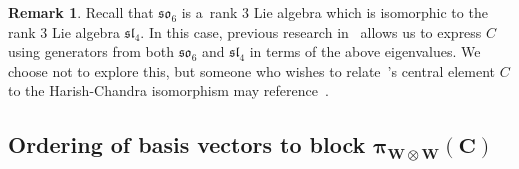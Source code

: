 \documentclass[pdftex]{sigma}
\numberwithin{equation}{section}
\theoremstyle{definition}
\newtheorem{Remark}[Theorem]{Remark}
\begin{document}
\begin{Remark}
 Recall that $\mathfrak{so}_6$ is a~rank 3 Lie algebra which is isomorphic to the rank 3 Lie algebra $\mathfrak{sl}_4$. In this case, previous research in~\cite{HarishChandraComment} allows us to express $C$ using generators from both $\mathfrak{so}_6$ and $\mathfrak{sl}_4$ in terms of the above eigenvalues. We choose not to explore this, but someone who wishes to relate~\cite{kuan2020interactingparticlesystemstype}'s central element $C$ to the Harish-Chandra isomorphism may reference~\cite{HarishChandraComment}.
\end{Remark}

\subsection[Ordering of basis vectors to block pi\_\{W otimes W\}(C)]{Ordering of basis vectors to block $\boldsymbol{\pi_{W\otimes W} (C)}$}
\end{document}
